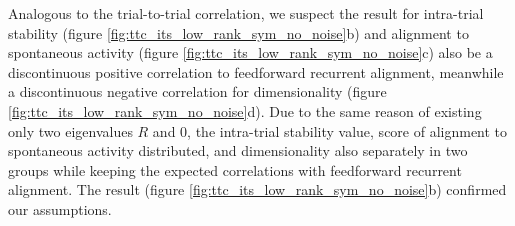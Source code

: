 \documentclass[11pt]{article}
\begin{document}
	Analogous to the trial-to-trial correlation, we suspect the result for intra-trial stability (figure \ref{fig:ttc_its_low_rank_sym_no_noise}b) and alignment to spontaneous activity (figure \ref{fig:ttc_its_low_rank_sym_no_noise}c) also be a discontinuous positive correlation to feedforward recurrent alignment, meanwhile a discontinuous negative correlation for dimensionality (figure \ref{fig:ttc_its_low_rank_sym_no_noise}d). Due to the same reason of existing only two eigenvalues $R$ and $0$, the intra-trial stability value, score of alignment to spontaneous activity distributed, and dimensionality also separately in two groups while keeping the expected correlations with feedforward recurrent alignment. The result (figure \ref{fig:ttc_its_low_rank_sym_no_noise}b) confirmed our assumptions. 
	
	
\end{document}
